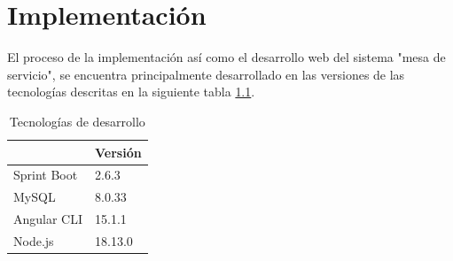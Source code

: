 \chapter{Implementación}
El proceso de la implementación así como el desarrollo web del sistema "mesa de servicio", se encuentra principalmente desarrollado en las  versiones de las tecnologías descritas en la siguiente tabla \ref{tab:TecApli}.

\begin{table}[H]
	\centering
	\caption{Tecnologías de desarrollo}
	\begin{tabular}{|p{8.145em}|p{9.07em}|}
		\toprule
		\rowcolor[rgb]{ .776,  .878,  .706} \multicolumn{1}{|c|}{\textbf{Tecnología}} & \multicolumn{1}{c|}{\textbf{Versión}} \\
		\midrule
		Sprint Boot & 2.6.3 \\
		\midrule
		MySQL & 8.0.33 \\
		\midrule
		Angular CLI & 15.1.1 \\
		\midrule
		Node.js & 18.13.0 \\
		\bottomrule
	\end{tabular}%
	\label{tab:TecApli}%
\end{table}%

